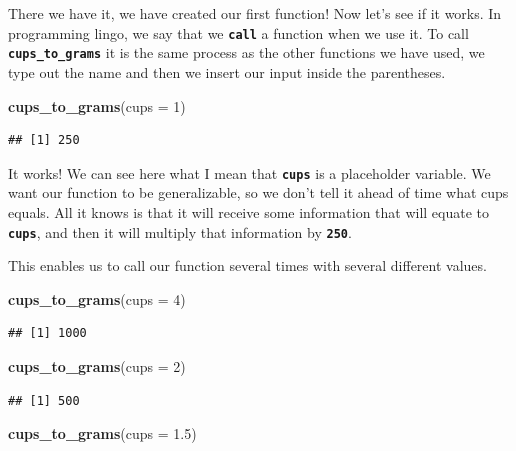\documentclass[
]{book}
\newenvironment{Shaded}{\begin{snugshade}}{\end{snugshade}}
\newcommand{\AttributeTok}[1]{\textcolor[rgb]{0.13,0.29,0.53}{#1}}
\newcommand{\DecValTok}[1]{\textcolor[rgb]{0.00,0.00,0.81}{#1}}
\newcommand{\FloatTok}[1]{\textcolor[rgb]{0.00,0.00,0.81}{#1}}
\newcommand{\FunctionTok}[1]{\textcolor[rgb]{0.13,0.29,0.53}{\textbf{#1}}}
\newcommand{\NormalTok}[1]{#1}
\begin{document}
There we have it, we have created our first function! Now let's see if it works. In programming lingo, we say that we \textbf{\texttt{call}} a function when we use it. To call \textbf{\texttt{cups\_to\_grams}} it is the same process as the other functions we have used, we type out the name and then we insert our input inside the parentheses.

\begin{Shaded}
\begin{Highlighting}[]
\FunctionTok{cups\_to\_grams}\NormalTok{(}\AttributeTok{cups =} \DecValTok{1}\NormalTok{)}
\end{Highlighting}
\end{Shaded}

\begin{verbatim}
## [1] 250
\end{verbatim}

It works! We can see here what I mean that \textbf{\texttt{cups}} is a placeholder variable. We want our function to be generalizable, so we don't tell it ahead of time what cups equals. All it knows is that it will receive some information that will equate to \textbf{\texttt{cups}}, and then it will multiply that information by \textbf{\texttt{250}}.

This enables us to call our function several times with several different values.

\begin{Shaded}
\begin{Highlighting}[]
\FunctionTok{cups\_to\_grams}\NormalTok{(}\AttributeTok{cups =} \DecValTok{4}\NormalTok{)}
\end{Highlighting}
\end{Shaded}

\begin{verbatim}
## [1] 1000
\end{verbatim}

\begin{Shaded}
\begin{Highlighting}[]
\FunctionTok{cups\_to\_grams}\NormalTok{(}\AttributeTok{cups =} \DecValTok{2}\NormalTok{)}
\end{Highlighting}
\end{Shaded}

\begin{verbatim}
## [1] 500
\end{verbatim}

\begin{Shaded}
\begin{Highlighting}[]
\FunctionTok{cups\_to\_grams}\NormalTok{(}\AttributeTok{cups =} \FloatTok{1.5}\NormalTok{)}
\end{Highlighting}
\end{Shaded}
\end{document}
